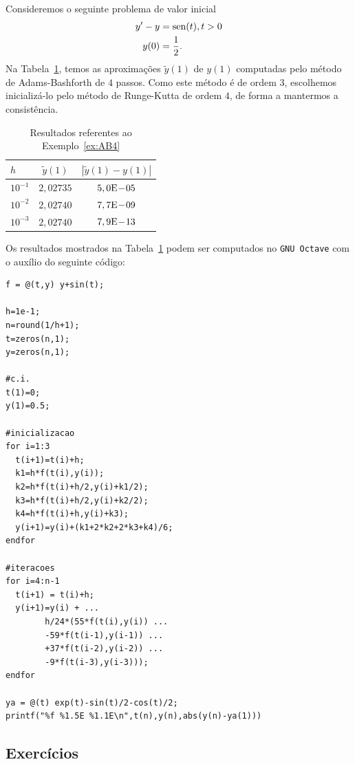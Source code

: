 \begin{ex}\label{ex:AB4}
  Consideremos o seguinte problema de valor inicial
  \begin{align}
    y' - y &= \operatorname{sen}(t), t>0\\
    y(0) &= \frac{1}{2}.
  \end{align}
  Na Tabela~\ref{tab:ex_AB4}, temos as aproximações $\tilde{y}(1)$ de $y(1)$ computadas pelo método de Adams-Bashforth de $4$ passos. Como este método é de ordem $3$, escolhemos inicializá-lo pelo método de Runge-Kutta de ordem $4$, de forma a mantermos a consistência.
 
  \begin{table}[h!]
    \centering
    \begin{tabular}{l|cc}
      $h$ & $\tilde{y}(1)$ & $|\tilde{y}(1)-y(1)|$\\\hline
      $10^{-1}$ & $2,02735$ & $5,0\mathrm{E}\!-\!05$ \\
      $10^{-2}$ & $2,02740$ & $7,7\mathrm{E}\!-\!09$ \\
      $10^{-3}$ & $2,02740$ & $7,9\mathrm{E}\!-\!13$ \\\hline
   \end{tabular}
    \caption{Resultados referentes ao Exemplo~\ref{ex:AB4}}
    \label{tab:ex_AB4}
  \end{table}

\ifisoctave
Os resultados mostrados na Tabela~\ref{tab:ex_AB4} podem ser computados no \verb+GNU Octave+ com o auxílio do seguinte código:
\begin{verbatim}
f = @(t,y) y+sin(t);

h=1e-1;
n=round(1/h+1);
t=zeros(n,1);
y=zeros(n,1);

#c.i.
t(1)=0;
y(1)=0.5;

#inicializacao
for i=1:3
  t(i+1)=t(i)+h;
  k1=h*f(t(i),y(i));
  k2=h*f(t(i)+h/2,y(i)+k1/2);
  k3=h*f(t(i)+h/2,y(i)+k2/2);
  k4=h*f(t(i)+h,y(i)+k3);
  y(i+1)=y(i)+(k1+2*k2+2*k3+k4)/6;
endfor

#iteracoes
for i=4:n-1
  t(i+1) = t(i)+h;
  y(i+1)=y(i) + ...
        h/24*(55*f(t(i),y(i)) ...
        -59*f(t(i-1),y(i-1)) ...
        +37*f(t(i-2),y(i-2)) ...
        -9*f(t(i-3),y(i-3)));
endfor

ya = @(t) exp(t)-sin(t)/2-cos(t)/2;
printf("%f %1.5E %1.1E\n",t(n),y(n),abs(y(n)-ya(1)))
\end{verbatim}
\fi
\end{ex}

\subsection*{Exercícios}

